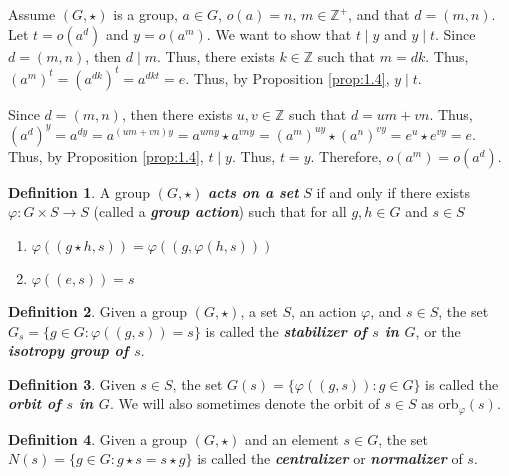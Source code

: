 \documentclass{article}
\makeatletter
\theoremstyle{definition}
\newtheorem{definition}{Definition}[section]
\theoremstyle{remark}
\let\oldproofname=\proofname
\renewcommand{\proofname}{\bf{\textit{\oldproofname}}}
\theoremstyle{definition}
\renewenvironment{proof}[1][\proofname]{\par
  \pushQED{\qed}%
  \normalfont \topsep6\p@\@plus6\p@\relax
  \list{}{\leftmargin=0mm
          \rightmargin=0mm
          \settowidth{\itemindent}{\itshape#1}%
          \labelwidth=4mm
          \parsep=0pt \listparindent=0mm%
  }
  \item[\hskip\labelsep
        \itshape
    #1\@addpunct{.}]\ignorespaces
}{%
  \popQED\endlist\@endpefalse
}
\makeatother
\begin{document}
        \begin{proof}
            Assume $(G,\star)$ is a group, $a\in G$, $o(a)=n$, $m\in\mathbb{Z}^{+}$, and that $d=(m,n)$. Let $t=o(a^d)$ and $y=o(a^m)$. We want to show that $t\mid y$ and $y\mid t$. Since $d=(m,n)$, then $d\mid m$. Thus, there exists $k\in\mathbb{Z}$ such that $m=dk$. Thus, $(a^m)^t=(a^{dk})^t=a^{dkt}=e$. Thus, by Proposition \ref{prop:1.4}, $y\mid t$.\par\hspace{4mm} Since $d=(m,n)$, then there exists $u,v\in\mathbb{Z}$ such that $d=um+vn$. Thus, $(a^d)^y=a^{dy}=a^{(um+vn)y}=a^{umy}\star a^{vny}=(a^m)^{uy}\star(a^n)^{vy}=e^u\star e^{vy}=e$. Thus, by Proposition \ref{prop:1.4}, $t\mid y$. Thus, $t=y$. Therefore, $o(a^m)=o(a^d)$.
        \end{proof}
        
\newpage
    \begin{definition}\label{df:1.1}
        A group $(G,\star)$ \textbf{\textit{acts on a set}} $S$ if and only if there exists $\varphi\colon G\times S\rightarrow S$ (called a \textbf{\textit{group action}}) such that for all $g,h\in G$ and $s\in S$
        
        \begin{enumerate}[label=(\roman*)]
            \item $\varphi((g\star h,s))=\varphi((g,\varphi(h,s)))$
            \item $\varphi((e,s))=s$
        \end{enumerate}
    \end{definition}
    \begin{definition}\label{df:1.2}
        Given a group $(G,\star)$, a set $S$, an action $\varphi$, and $s\in S$, the set $G_s=\{g\in G\colon\varphi((g,s))=s\}$ is called the \textbf{\textit{stabilizer of $s$ in $G$}}, or the \textbf{\textit{isotropy group of $s$}}.
    \end{definition}
    \begin{definition}\label{df:1.3}
        Given $s\in S$, the set $G(s)=\{\varphi((g,s))\colon g\in G\}$ is called the \textbf{\textit{orbit of $s$ in $G$}}. We will also sometimes denote the orbit of $s\in S$ as orb$_{\varphi}(s)$.
    \end{definition}
    \begin{definition}\label{df:1.4}
        Given a group $(G,\star)$ and an element $s\in G$, the set $N(s)=\{g\in G\colon g\star s=s\star g\}$ is called the \textbf{\textit{centralizer}} or \textbf{\textit{normalizer}} of $s$.
    \end{definition}
    
\end{document}
